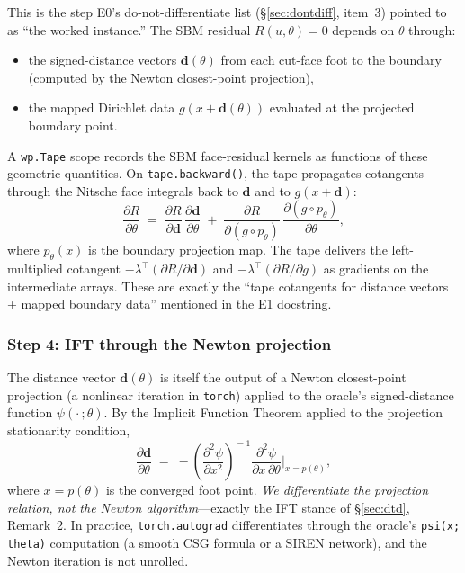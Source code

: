 \documentclass[11pt]{article}
\begin{document}
This is the step E0's do-not-differentiate list (\S\ref{sec:dontdiff},
item~3) pointed to as ``the worked instance.''  The SBM residual
$R(u, \theta) = 0$ depends on $\theta$ through:
\begin{itemize}
  \item the signed-distance vectors $\mathbf{d}(\theta)$ from each cut-face
    foot to the boundary (computed by the Newton closest-point projection),
  \item the mapped Dirichlet data $g(x + \mathbf{d}(\theta))$ evaluated at
    the projected boundary point.
\end{itemize}
A \texttt{wp.Tape} scope records the SBM face-residual kernels as
functions of these geometric quantities.  On \texttt{tape.backward()},
the tape propagates cotangents through the Nitsche face integrals back to
$\mathbf{d}$ and to $g(x + \mathbf{d})$:
\begin{equation}
  \frac{\partial R}{\partial \theta}
  \;=\; \frac{\partial R}{\partial \mathbf{d}}\,
  \frac{\partial \mathbf{d}}{\partial \theta}
  \;+\; \frac{\partial R}{\partial (g \circ p_\theta)}\,
  \frac{\partial (g \circ p_\theta)}{\partial \theta},
  \label{eq:e1dRdtheta}
\end{equation}
where $p_\theta(x)$ is the boundary projection map.  The tape delivers
the left-multiplied cotangent $-\lambda^\top (\partial R/\partial \mathbf{d})$
and $-\lambda^\top (\partial R/\partial g)$ as gradients on the intermediate
arrays.  These are exactly the ``tape cotangents for distance vectors +
mapped boundary data'' mentioned in the E1 docstring.

\subsubsection{Step 4: IFT through the Newton projection}
\label{sec:e1ift}

The distance vector $\mathbf{d}(\theta)$ is itself the output of a Newton
closest-point projection (a nonlinear iteration in \texttt{torch}) applied
to the oracle's signed-distance function $\psi(\cdot\,;\theta)$.
By the Implicit Function Theorem applied to the projection stationarity
condition,
\begin{equation}
  \frac{\partial \mathbf{d}}{\partial \theta}
  \;=\; -\!\left(\frac{\partial^2 \psi}{\partial x^2}\right)^{\!-1}
  \frac{\partial^2 \psi}{\partial x\, \partial \theta}\biggr|_{x = p(\theta)},
  \label{eq:e1ift}
\end{equation}
where $x = p(\theta)$ is the converged foot point.
\emph{We differentiate the projection relation, not the Newton
algorithm}---exactly the IFT stance of \S\ref{sec:dtd}, Remark~2.
In practice, \texttt{torch.autograd} differentiates through the oracle's
\texttt{psi(x; theta)} computation (a smooth CSG formula or a SIREN
network), and the Newton iteration is not unrolled.
\end{document}
